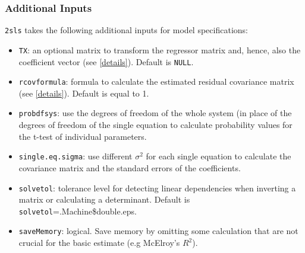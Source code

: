 \documentclass[12pt]{book}%
\begin{document}
\subsubsection{Additional Inputs}
\texttt{2sls} takes the following additional inputs for model
specifications:
\begin{itemize}
\item \texttt{TX}: an optional matrix to transform the regressor
matrix and, hence, also the coefficient vector (see \ref{details}). Default is \texttt{NULL}.
\item \texttt{rcovformula}: formula to calculate the estimated residual covariance
matrix (see \ref{details}). Default is equal to 1.
\item \texttt{probdfsys}: use the degrees of freedom of the whole system
(in place of the degrees of freedom of the single equation to calculate probability
values for the t-test of individual parameters. 
\item \texttt{single.eq.sigma}: use different $\sigma^2$ for each single
equation to calculate the covariance matrix and the standard errors of the coefficients.
\item \texttt{solvetol}: tolerance level for detecting linear dependencies when 
inverting a matrix or calculating a determinant. Default is \texttt {solvetol}=.Machine\$double.eps.
\item \texttt{saveMemory}: logical. Save memory by omitting some calculation that are
not crucial for the basic estimate (e.g McElroy's $R^2$).
\end{itemize}
\end{document}
